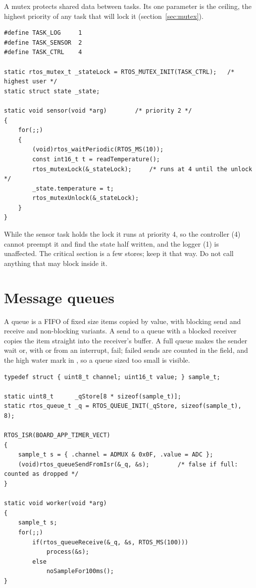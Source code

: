 A mutex protects shared data between tasks. Its one parameter is the ceiling, the highest
priority of any task that will lock it (section~\ref{sec:mutex}).

\begin{lstlisting}
#define TASK_LOG     1
#define TASK_SENSOR  2
#define TASK_CTRL    4

static rtos_mutex_t _stateLock = RTOS_MUTEX_INIT(TASK_CTRL);   /* highest user */
static struct state _state;

static void sensor(void *arg)        /* priority 2 */
{
    for(;;)
    {
        (void)rtos_waitPeriodic(RTOS_MS(10));
        const int16_t t = readTemperature();
        rtos_mutexLock(&_stateLock);     /* runs at 4 until the unlock */
        _state.temperature = t;
        rtos_mutexUnlock(&_stateLock);
    }
}
\end{lstlisting}

While the sensor task holds the lock it runs at priority 4, so the controller (4) cannot
preempt it and find the state half written, and the logger (1) is unaffected. The
critical section is a few stores; keep it that way. Do not call anything that may block
inside it.

\section{Message queues}

A queue is a FIFO of fixed size items copied by value, with blocking send and receive and
non-blocking  variants. A send to a queue with a blocked receiver copies
the item straight into the receiver's buffer. A full queue makes the sender wait or, with
 or from an interrupt, fail; failed sends are counted in the
 field, and the high water mark in , so a queue sized too
small is visible.

\begin{lstlisting}
typedef struct { uint8_t channel; uint16_t value; } sample_t;

static uint8_t      _qStore[8 * sizeof(sample_t)];
static rtos_queue_t _q = RTOS_QUEUE_INIT(_qStore, sizeof(sample_t), 8);

RTOS_ISR(BOARD_APP_TIMER_VECT)
{
    sample_t s = { .channel = ADMUX & 0x0F, .value = ADC };
    (void)rtos_queueSendFromIsr(&_q, &s);        /* false if full: counted as dropped */
}

static void worker(void *arg)
{
    sample_t s;
    for(;;)
        if(rtos_queueReceive(&_q, &s, RTOS_MS(100)))
            process(&s);
        else
            noSampleFor100ms();
}
\end{lstlisting}


